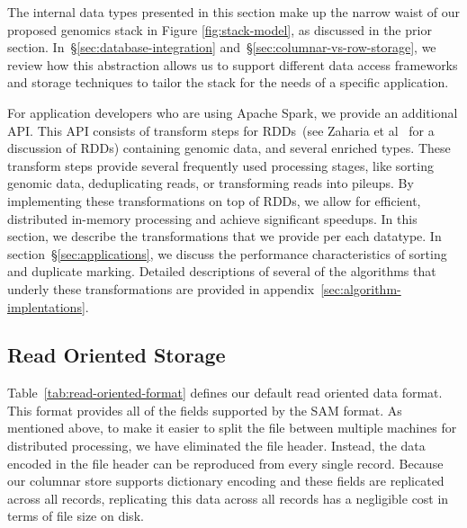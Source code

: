 \documentclass[10pt,twocolumn]{article}
\theoremstyle{plain}
\begin{document}
The internal data types presented in this section make up the narrow waist of our proposed genomics stack in Figure \ref{fig:stack-model},
as discussed in the prior section. In~\S\ref{sec:database-integration} and~\S\ref{sec:columnar-vs-row-storage}, we review how this
abstraction allows us to support different data access frameworks and storage techniques to tailor the stack for the needs of
a specific application.

For application developers who are using Apache Spark, we provide an additional API. This API consists of transform steps for RDDs~(see
Zaharia et al~\cite{zaharia12} for a discussion of RDDs) containing genomic data, and several enriched types. These transform steps provide
several frequently used processing stages, like sorting genomic data, deduplicating reads, or transforming reads into pileups. By implementing
these transformations on top of RDDs, we allow for efficient, distributed in-memory processing and achieve significant speedups. In this section,
we describe the transformations that we provide per each datatype. In section~\S\ref{sec:applications}, we discuss the performance
characteristics of sorting and duplicate marking. Detailed descriptions of several of the algorithms that underly these transformations are provided
in appendix~\ref{sec:algorithm-implentations}.

\subsection{Read Oriented Storage}
\label{sec:read-oriented-storage}

Table~\ref{tab:read-oriented-format} defines our default read oriented data format. This format provides all of the
fields supported by the SAM format. As mentioned above, to make it easier to split the file between multiple machines for distributed processing,
we have eliminated the file header. Instead, the data encoded in the file header can be reproduced from every single
record. Because our columnar store supports dictionary encoding and these fields are replicated across all records,
replicating this data across all records has a negligible cost in terms of file size on disk.
\end{document}

